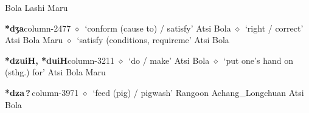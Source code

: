 \hspace{1ex}
         Bola 
\hspace{1ex}
         Lashi 
\hspace{1ex}
         Maru 
  \item {\footnotesize \textbf{*dʒa}}{\tiny column-2477}
         $\diamond$~`conform (cause to) / satisfy'
         Atsi 
\hspace{1ex}
         Bola 
\hspace{1ex}
         $\diamond$~`right / correct'
         Atsi 
\hspace{1ex}
         Bola 
\hspace{1ex}
         Maru 
\hspace{1ex}
         $\diamond$~`satisfy (conditions, requireme'
         Atsi 
\hspace{1ex}
         Bola 
  \item {\footnotesize \textbf{*dzuiH, *duiH}}{\tiny column-3211}
         $\diamond$~`do / make'
         Atsi 
\hspace{1ex}
         Bola 
\hspace{1ex}
         $\diamond$~`put one's hand on (sthg.) for'
         Atsi 
\hspace{1ex}
         Bola 
\hspace{1ex}
         Maru 
  \item {\footnotesize \textbf{*dza\,?\,}}{\tiny column-3971}
         $\diamond$~`feed (pig) / pigwash'
         Rangoon 
\hspace{1ex}
         Achang\_Longchuan 
\hspace{1ex}
         Atsi 
\hspace{1ex}
         Bola 
\hspace{1ex}
